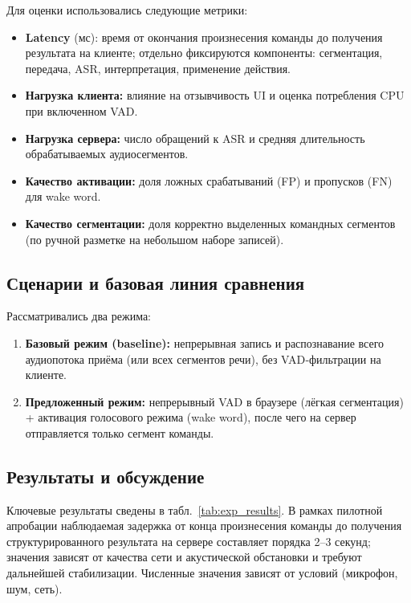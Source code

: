 Для оценки использовались следующие метрики:
\begin{itemize}
    \item \textbf{Latency} (мс): время от окончания произнесения команды до получения результата на клиенте; отдельно фиксируются компоненты: сегментация, передача, ASR, интерпретация, применение действия.
    \item \textbf{Нагрузка клиента:} влияние на отзывчивость UI и оценка потребления CPU при включенном VAD.
    \item \textbf{Нагрузка сервера:} число обращений к ASR и средняя длительность обрабатываемых аудиосегментов.
    \item \textbf{Качество активации:} доля ложных срабатываний (FP) и пропусков (FN) для wake word.
    \item \textbf{Качество сегментации:} доля корректно выделенных командных сегментов (по ручной разметке на небольшом наборе записей).
\end{itemize}

\subsection{Сценарии и базовая линия сравнения}
\label{subsec:setup}

Рассматривались два режима:
\begin{enumerate}
    \item \textbf{Базовый режим (baseline):} непрерывная запись и распознавание всего аудиопотока приёма (или всех сегментов речи), без VAD‑фильтрации на клиенте.
    \item \textbf{Предложенный режим:} непрерывный VAD в браузере (лёгкая сегментация) + активация голосового режима (wake word), после чего на сервер отправляется только сегмент команды.
\end{enumerate}

\subsection{Результаты и обсуждение}
\label{subsec:results}

Ключевые результаты сведены в табл.~\ref{tab:exp_results}. В рамках пилотной апробации наблюдаемая задержка от конца произнесения команды до получения структурированного результата на сервере составляет порядка 2--3 секунд; значения зависят от качества сети и акустической обстановки и требуют дальнейшей стабилизации.
Численные значения зависят от условий (микрофон, шум, сеть).

